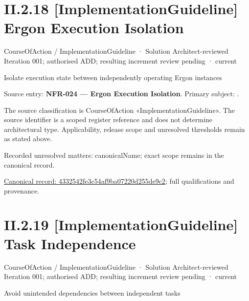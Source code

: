 \section*{II.2.18 [ImplementationGuideline] Ergon Execution Isolation}
\label{navigation:II.2.18}

\label{element:4332542fe3c54af9ba07220d255de9c2}
{\small CourseOfAction / ImplementationGuideline · Solution Architect-reviewed Iteration 001; authorised ADD; resulting increment review pending · current}\par

Isolate execution state between independently operating Ergon instances



Source entry: \textbf{NFR-024 — Ergon Execution Isolation}. Primary subject: \texttt{}.



The source classification is CourseOfAction «ImplementationGuideline». The source identifier is a scoped register reference and does not determine architectural type. Applicability, release scope and unresolved thresholds remain as stated above.


{\small Recorded unresolved matters: canonicalName; exact scope remains in the canonical record.}\par
{\footnotesize \href{../../../../continuum/strategy/course-of-action/implementation-guideline/4332542fe3c54af9ba07220d255de9c2.md}{Canonical record: 4332542fe3c54af9ba07220d255de9c2}; full qualifications and provenance.}\par
\section*{II.2.19 [ImplementationGuideline] Task Independence}
\label{navigation:II.2.19}

\label{element:80fe052799944843917044749288f297}
{\small CourseOfAction / ImplementationGuideline · Solution Architect-reviewed Iteration 001; authorised ADD; resulting increment review pending · current}\par

Avoid unintended dependencies between independent tasks



